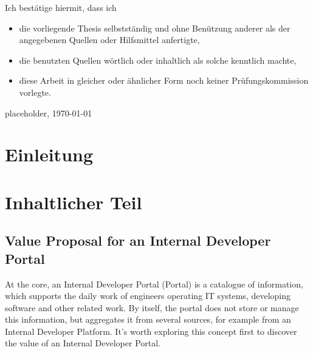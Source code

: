 \documentclass[a4paper,12pt]{article}
\begin{document}
    Ich bestätige hiermit, dass ich
    \begin{itemize}
        \item die vorliegende Thesis selbstständig und ohne Benützung anderer als der angegebenen Quellen oder Hilfsmittel anfertigte,
        \item die benutzten Quellen wörtlich oder inhaltlich als solche kenntlich machte,
        \item diese Arbeit in gleicher oder ähnlicher Form noch keiner Prüfungskommission vorlegte.
    \end{itemize}
    placeholder, \today\newline


    \section{Einleitung}


    \section{Inhaltlicher Teil}

    \subsection{Value Proposal for an Internal Developer Portal}
    At the core, an Internal Developer Portal (Portal) is a catalogue of information, which supports the daily work of
    engineers operating IT systems, developing software and other related work.
    By itself, the portal does not store or manage this information, but aggregates it from several sources, for example from an Internal Developer Platform.
    It's worth exploring this concept first to discover the value of an Internal Developer Portal.
\end{document}
